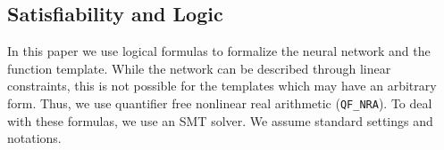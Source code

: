     \subsection{Satisfiability and Logic}
        In this paper we use logical formulas to formalize the neural network and the function template. While the network can be described through linear constraints, this is not possible for the templates which may have an arbitrary form. Thus, we use quantifier free nonlinear real arithmetic (\texttt{QF\_NRA}). To deal with these formulas, we use an SMT solver. We assume standard settings and notations.